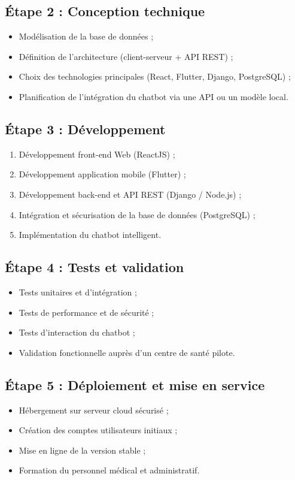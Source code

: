 ﻿\documentclass[12pt,a4paper]{report}
\begin{document}
\subsection*{Étape 2 : Conception technique}  
\begin{itemize}
    \item Modélisation de la base de données ;
    \item Définition de l’architecture (client-serveur + API REST) ;
    \item Choix des technologies principales (React, Flutter, Django, PostgreSQL) ;
    \item Planification de l’intégration du chatbot via une API ou un modèle local.
\end{itemize}

\subsection*{Étape 3 : Développement}  
\begin{enumerate}
    \item Développement front-end Web (ReactJS) ;
    \item Développement application mobile (Flutter) ;
    \item Développement back-end et API REST (Django / Node.js) ;
    \item Intégration et sécurisation de la base de données (PostgreSQL) ;
    \item Implémentation du chatbot intelligent.
\end{enumerate}

\subsection*{Étape 4 : Tests et validation}  
\begin{itemize}
    \item Tests unitaires et d’intégration ;
    \item Tests de performance et de sécurité ;
    \item Tests d’interaction du chatbot ;
    \item Validation fonctionnelle auprès d’un centre de santé pilote.
\end{itemize}

\subsection*{Étape 5 : Déploiement et mise en service}  
\begin{itemize}
    \item Hébergement sur serveur cloud sécurisé ;
    \item Création des comptes utilisateurs initiaux ;
    \item Mise en ligne de la version stable ;
    \item Formation du personnel médical et administratif.
\end{itemize}
\end{document}
